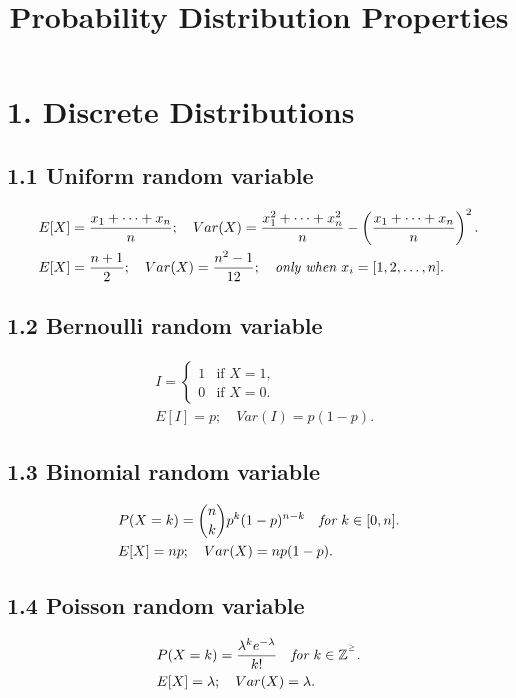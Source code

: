 \documentclass{article}
\title{Probability Distribution Properties}
\begin{document}
 
\date{}

\maketitle 
\section*{1. Discrete Distributions}
\subsection*{1.1 Uniform random variable}
\begin{align}
    & E[X] = \frac{x_1 + \dots + x_n}{n}; \quad Var(X) = \frac{x_1^2 + \dots + x_n^2}{n} - \left(\frac{x_1 + \dots + x_n}{n}\right)^2. \nonumber \\
    & E[X] = \frac{n+1}{2}; \quad Var(X) = \frac{n^2-1}{12}; \quad \emph{only when $x_i = [1, 2, \dots, n]$}. \nonumber
\end{align}

\subsection*{1.2 Bernoulli random variable}
\begin{align}
    & I = \begin{cases}
        1 & \text{if $X = 1$}, \\
        0 & \text{if $X = 0$}.
    \end{cases} \nonumber \\
    & E[I] = p; \quad Var(I) = p(1-p). \nonumber
\end{align}

\subsection*{1.3 Binomial random variable}
\begin{align}
    & P(X=k) = {n\choose k}p^k(1-p)^{n-k} \quad \emph{for } k \in [0,n]. \nonumber \\
    & E[X] = np; \quad Var(X) = np(1-p). \nonumber
\end{align}

\subsection*{1.4 Poisson random variable}
\begin{align}
    & P(X=k) = \frac{\lambda^k e^{-\lambda}}{k!} \quad \emph{for } k \in \mathbb{Z}^{^\ge}. \nonumber \\
    & E[X] = \lambda; \quad Var(X) = \lambda. \nonumber
\end{align}
\end{document}
